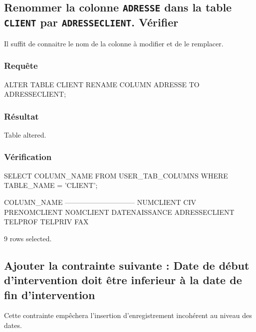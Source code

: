 \documentclass[•]{article}
\begin{document}
\subsection{Renommer la colonne \texttt{ADRESSE} dans la table \texttt{CLIENT} par \texttt{ADRESSECLIENT}. Vérifier}
\textrm{Il suffit de connaitre le nom de la colonne à modifier et de le remplacer.}
\subsubsection{Requête}
\begin{sql}
ALTER TABLE CLIENT RENAME COLUMN ADRESSE TO ADRESSECLIENT;
\end{sql}
\subsubsection{Résultat}
\begin{sql}
Table altered.
\end{sql}
\subsubsection{Vérification}
\begin{sql}
SELECT COLUMN_NAME FROM USER_TAB_COLUMNS WHERE TABLE_NAME = 'CLIENT';

COLUMN_NAME                                                                     
------------------------------                                                  
NUMCLIENT                                                                       
CIV                                                                             
PRENOMCLIENT                                                                    
NOMCLIENT                                                                       
DATENAISSANCE                                                                   
ADRESSECLIENT                                                                   
TELPROF                                                                         
TELPRIV                                                                         
FAX                                                                             

9 rows selected.
\end{sql}
\subsection{Ajouter la contrainte suivante : Date de début d’intervention doit être inferieur à la date de fin d’intervention}
\textrm{Cette contrainte empêchera l'insertion d'enregistrement incohérent au niveau des dates. }
\end{document}
